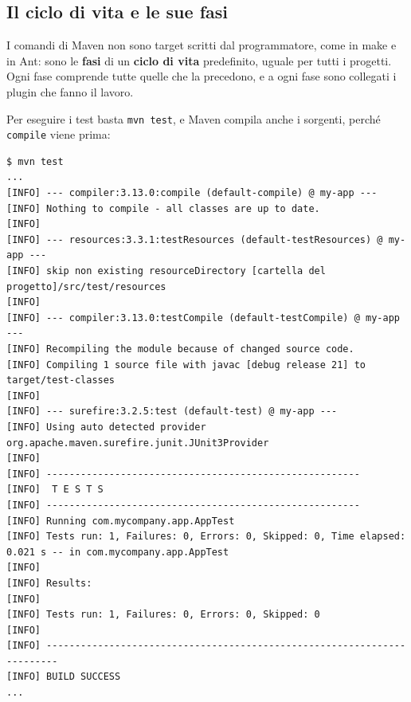 \subsection{Il ciclo di vita e le sue fasi}

I comandi di Maven non sono target scritti dal programmatore, come in make e in Ant: sono le \textbf{fasi} di un
\textbf{ciclo di vita} predefinito, uguale per tutti i progetti. Ogni fase comprende tutte quelle che la precedono, e a
ogni fase sono collegati i plugin che fanno il lavoro.

\begin{center}
\end{center}

Per eseguire i test basta \texttt{mvn test}, e Maven compila anche i sorgenti, perché \texttt{compile} viene prima:

\begin{lstlisting}[style=shell, name=Terminale]
$ mvn test
...
[INFO] --- compiler:3.13.0:compile (default-compile) @ my-app ---
[INFO] Nothing to compile - all classes are up to date.
[INFO]
[INFO] --- resources:3.3.1:testResources (default-testResources) @ my-app ---
[INFO] skip non existing resourceDirectory [cartella del progetto]/src/test/resources
[INFO]
[INFO] --- compiler:3.13.0:testCompile (default-testCompile) @ my-app ---
[INFO] Recompiling the module because of changed source code.
[INFO] Compiling 1 source file with javac [debug release 21] to target/test-classes
[INFO]
[INFO] --- surefire:3.2.5:test (default-test) @ my-app ---
[INFO] Using auto detected provider org.apache.maven.surefire.junit.JUnit3Provider
[INFO]
[INFO] -------------------------------------------------------
[INFO]  T E S T S
[INFO] -------------------------------------------------------
[INFO] Running com.mycompany.app.AppTest
[INFO] Tests run: 1, Failures: 0, Errors: 0, Skipped: 0, Time elapsed: 0.021 s -- in com.mycompany.app.AppTest
[INFO]
[INFO] Results:
[INFO]
[INFO] Tests run: 1, Failures: 0, Errors: 0, Skipped: 0
[INFO]
[INFO] ------------------------------------------------------------------------
[INFO] BUILD SUCCESS
...
\end{lstlisting}

